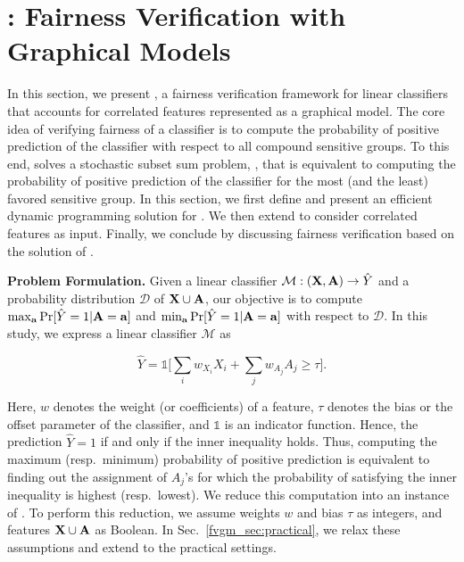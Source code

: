 \section{{\fvgm}: Fairness Verification with Graphical Models}\label{fvgm_sec:fvgm}

In this section, we present {\fvgm}, a fairness verification framework for linear classifiers that accounts for correlated features represented as a graphical model. The core idea of verifying fairness of a classifier is to compute the probability of positive prediction of the classifier with respect to all compound sensitive groups. To this end, {\fvgm} solves a stochastic subset sum problem, {\stochastic}, that is equivalent to computing the probability of positive prediction of the classifier for the most (and the least) favored sensitive group. In this section, we first define {\stochastic} and present an efficient dynamic programming solution for {\stochastic}. We then extend {\stochastic} to consider correlated features as input. Finally, we conclude by discussing fairness verification based on the solution of {\stochastic}.


\textbf{Problem Formulation.}	
Given a linear classifier $ \mathcal{M}: (\mathbf{X}, \mathbf{A}) \rightarrow \hat{Y} $ and a probability distribution $ \mathcal{D} $ of $ \mathbf{X} \cup \mathbf{A} $, our objective is to compute $ \max_{ \mathbf{a}} \Pr[\hat{Y} =1 | \mathbf{A} = \mathbf{a}] $ and $ \min_{ \mathbf{a}} \Pr[\hat{Y} =1 | \mathbf{A} = \mathbf{a}] $ with respect to $ \mathcal{D} $. In this study, we express a linear classifier $\mathcal{M}$ as 

\[	\hat{Y} = \mathds{1}\Big[\sum_{i} w_{X_i}X_i + \sum_{j} w_{A_j}A_j \ge \tau\Big].\]

Here, $ w $ denotes the weight (or coefficients) of a feature, $ \tau $ denotes the bias or the offset parameter of the classifier, and $\mathds{1}$ is an indicator function. Hence, the prediction $ \hat{Y} =1 $ if and only if the inner inequality holds.
Thus, computing the maximum (resp.\ minimum) probability of positive prediction is equivalent to finding out the assignment of $A_j$'s for which the probability of satisfying the inner inequality is highest (resp.\ lowest). We reduce this computation into an instance of {\stochastic}. To perform this reduction, we assume  weights $ w $ and bias $ \tau $ as integers, and features $\mathbf{X} \cup \mathbf{A} $ as Boolean. In Sec.~\ref{fvgm_sec:practical}, we relax these assumptions and extend to the practical settings. 

